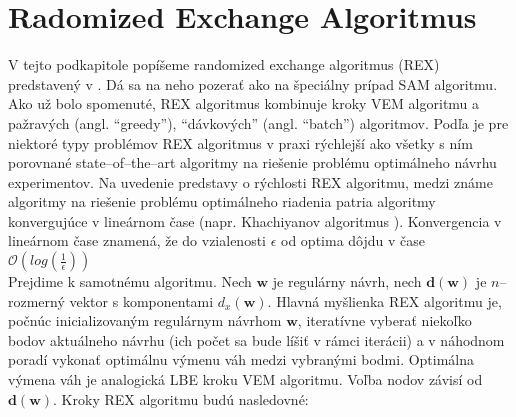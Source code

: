 \section {Radomized Exchange Algoritmus}

V tejto podkapitole popíšeme randomized exchange algoritmus (REX) predstavený v \cite{rex_harman}. Dá sa na neho pozerať ako na špeciálny prípad SAM algoritmu. Ako už bolo spomenuté, REX algoritmus kombinuje kroky VEM algoritmu a pažravých (angl. ``greedy''), ``dávkových'' (angl. ``batch'') algoritmov. Podľa \cite{rex_harman} je pre niektoré typy problémov REX algoritmus v praxi rýchlejší ako všetky s ním porovnané state--of--the--art algoritmy na riešenie problému optimálneho návrhu experimentov. Na uvedenie predstavy o rýchlosti REX algoritmu, medzi známe algoritmy na riešenie problému optimálneho riadenia patria algoritmy konvergujúce v lineárnom čase (napr. Khachiyanov algoritmus \cite{complexity_khachiyan}). Konvergencia v lineárnom čase znamená, že do vzialenosti $\epsilon$ od optima dôjdu v čase $\mathcal{O}(log(\frac{1}{\epsilon}))$ \\

Prejdime k samotnému algoritmu. Nech $\mathbf w$ je regulárny návrh, nech $\mathbf {d(w)}$ je $n$--rozmerný vektor s komponentami $d_x(\mathbf w)$. Hlavná myšlienka REX algoritmu je, počnúc inicializovaným regulárnym návrhom $\mathbf w$, iteratívne vyberať niekoľko bodov aktuálneho návrhu (ich počet sa bude líšiť v rámci iterácii) a v náhodnom poradí vykonať optimálnu výmenu váh medzi vybranými bodmi. Optimálna výmena váh je analogická LBE kroku VEM algoritmu. Voľba nodov závisí od $\mathbf{d(w)}$. Kroky REX algoritmu budú nasledovné:

